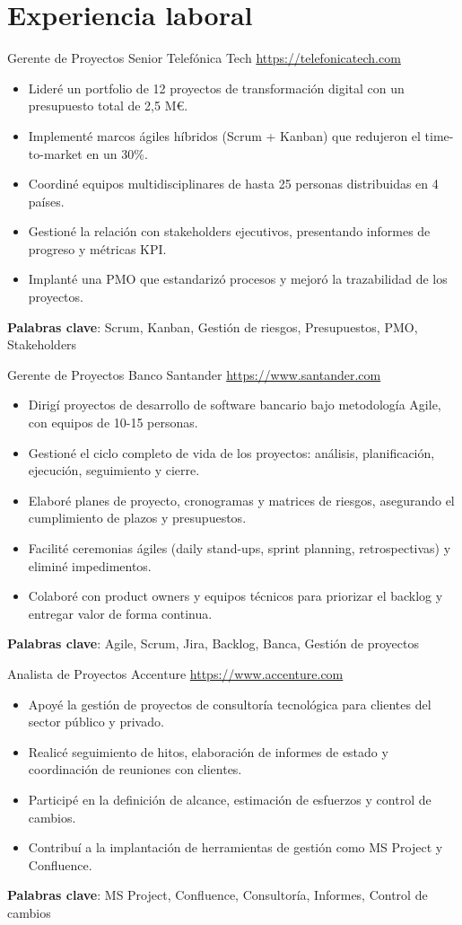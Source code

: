\documentclass[a4paper, serif, 10pt]{moderncv}
\begin{document}
\section{Experiencia laboral}

        {Gerente de Proyectos Senior}
        {Telefónica Tech}
        {\url{https://telefonicatech.com}}
        {}
        {\begin{itemize}
\item Lideré un portfolio de 12 proyectos de transformación digital con un presupuesto total de 2,5 M€.
\item Implementé marcos ágiles híbridos (Scrum + Kanban) que redujeron el time-to-market en un 30\%.
\item Coordiné equipos multidisciplinares de hasta 25 personas distribuidas en 4 países.
\item Gestioné la relación con stakeholders ejecutivos, presentando informes de progreso y métricas KPI.
\item Implanté una PMO que estandarizó procesos y mejoró la trazabilidad de los proyectos.
\end{itemize}
\textbf{Palabras clave}: Scrum, Kanban, Gestión de riesgos, Presupuestos, PMO, Stakeholders}

        {Gerente de Proyectos}
        {Banco Santander}
        {\url{https://www.santander.com}}
        {}
        {\begin{itemize}
\item Dirigí proyectos de desarrollo de software bancario bajo metodología Agile, con equipos de 10-15 personas.
\item Gestioné el ciclo completo de vida de los proyectos: análisis, planificación, ejecución, seguimiento y cierre.
\item Elaboré planes de proyecto, cronogramas y matrices de riesgos, asegurando el cumplimiento de plazos y presupuestos.
\item Facilité ceremonias ágiles (daily stand-ups, sprint planning, retrospectivas) y eliminé impedimentos.
\item Colaboré con product owners y equipos técnicos para priorizar el backlog y entregar valor de forma continua.
\end{itemize}
\textbf{Palabras clave}: Agile, Scrum, Jira, Backlog, Banca, Gestión de proyectos}

        {Analista de Proyectos}
        {Accenture}
        {\url{https://www.accenture.com}}
        {}
        {\begin{itemize}
\item Apoyé la gestión de proyectos de consultoría tecnológica para clientes del sector público y privado.
\item Realicé seguimiento de hitos, elaboración de informes de estado y coordinación de reuniones con clientes.
\item Participé en la definición de alcance, estimación de esfuerzos y control de cambios.
\item Contribuí a la implantación de herramientas de gestión como MS Project y Confluence.
\end{itemize}
\textbf{Palabras clave}: MS Project, Confluence, Consultoría, Informes, Control de cambios}
\end{document}
